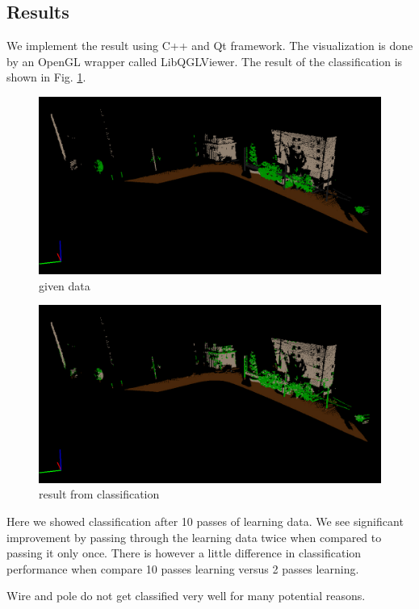 \documentclass[letterpaper]{article}
\begin{document}
\subsection{Results}
We implement the result using C++ and Qt framework. The visualization is done by an OpenGL wrapper called LibQGLViewer. The result of the classification is shown in Fig. \ref{fig:result from classification}.
\begin{figure}
  \centering
  \includegraphics[scale = 0.3]{raw_cloud}
\caption{given data}
\end{figure}

\begin{figure}
  \centering
  \includegraphics[scale = 0.3]{learned_cloud}
\caption{result from classification}
\label{fig:result from classification}
\end{figure}

 Here we showed classification after 10 passes of learning data. We see significant improvement by passing through the learning data twice when compared to passing it only once. There is however a little difference in classification performance when compare 10 passes learning versus 2 passes learning.

Wire and pole do not get classified very well for many potential reasons.
\end{document}
